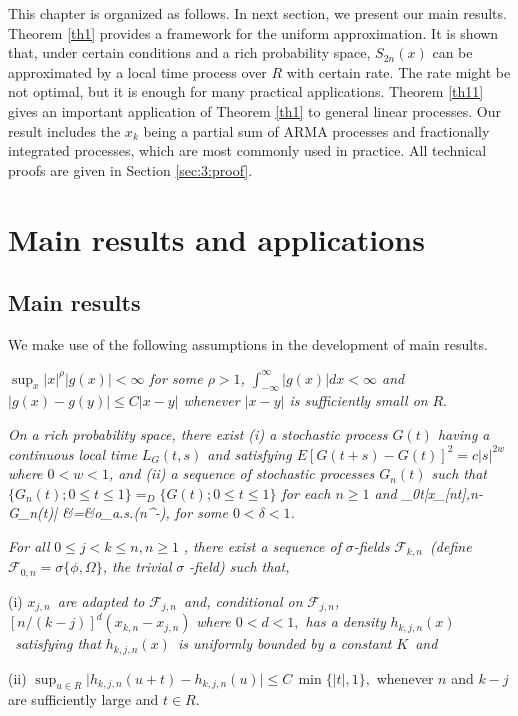This chapter is organized as follows.  In next section, we present our
main results. Theorem \ref {th1} provides a framework for the uniform approximation. It is shown that, under certain conditions and a rich probability space, $S_{2n}(x)$ can be approximated by a local time process over $R$ with certain rate. The rate might be not optimal, but it is enough for many practical applications.
Theorem \ref {th11} gives an important application of
Theorem \ref {th1} to general linear processes. Our result includes
 the $x_k$ being a partial sum of ARMA processes and fractionally integrated processes, which are most commonly used in practice. All technical proofs are given in Section \ref{sec:3:proof}.



\section{Main results and applications}
\subsection{Main results}

We make use of the following assumptions in the development of main results.

\begin{assump}  \textit{
$\sup_x |x|^{\rho} |g(x)|<\infty$ for some $\rho > 1$, $\int_{-\infty}^{\infty}|g(x)|dx<\infty$ \textit{and }\
$|g(x)-g(y)|\le C|x-y|$ whenever  $|x-y|$ is sufficiently small on }$R$.
\end{assump}


\begin{assump} 
 \textit{On a rich probability space, there exist (i) a stochastic process $G(t)$ having a continuous local time $L_G(t,s)$ and satisfying $E[G(t+s) -G(t)]^2 = c|s|^{2w}$ where $0 < w < 1$, and (ii) a sequence of stochastic processes $G_n(t)$  such that $\{G_n(t); 0 \le t \le 1\} =_D \{G(t); 0 \le t \le 1\}$ for each $n \ge 1$ and 
\be
 \sup_{0\le t}|x_{[nt],n}-G_n(t)| &=&o_{a.s.}(n^{-\delta}),
 \la {a2}
\ee
for some $0<\delta<1$. }
\end{assump}

\begin{assump} 
 \textit{For all }$0\leq j<k\leq n,n\geq 1$%
\textit{, there exist  a
sequence of }$\sigma $\textit{-fields }${\mathcal F}_{k,n}$\textit{\ (define }$%
{\mathcal F}_{0,n}=\sigma \{\phi ,\Omega \}$\textit{, the trivial }$\sigma $\textit{%
-field) such that,}

(i) $x_{j,n}$\textit{\ are adapted to }${\mathcal F}_{j,n}$\textit{\
and, conditional on }${\mathcal F}_{j,n}$\textit{,
}$[n/(k-j)]^d(x_{k,n}-x_{j,n})$\textit{ where $0<d<1,$ has a density
}$h_{k,j,n}(x)$\textit{\ satisfying that }$h_{k,j,n}(x)$\textit{\ is
uniformly bounded by a constant }$K$\textit{\ and }%

(ii) $  \sup_{u\in R}\big|h_{k,j,n}(u+t)-h_{k,j,n}(u)\big|\le C\, \min\{|t|, 1\},$
whenever $n$ and $k-j$ are sufficiently large and $t\in R$.
\end{assump}


